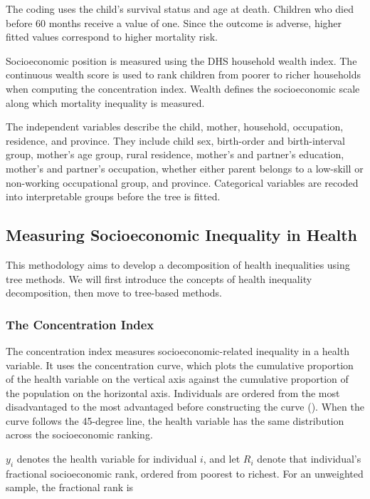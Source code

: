 \documentclass[
  11pt,
  a4paper,
]{article}
\begin{document}
The coding uses the child's survival status and age at death. Children
who died before 60 months receive a value of one. Since the outcome is
adverse, higher fitted values correspond to higher mortality risk.

Socioeconomic position is measured using the DHS household wealth index.
The continuous wealth score is used to rank children from poorer to
richer households when computing the concentration index. Wealth defines
the socioeconomic scale along which mortality inequality is measured.

The independent variables describe the child, mother, household,
occupation, residence, and province. They include child sex, birth-order
and birth-interval group, mother's age group, rural residence, mother's
and partner's education, mother's and partner's occupation, whether
either parent belongs to a low-skill or non-working occupational group,
and province. Categorical variables are recoded into interpretable
groups before the tree is fitted.

\subsection{Measuring Socioeconomic Inequality in
Health}\label{sec-measuring-socioeconomic-inequality}

This methodology aims to develop a decomposition of health inequalities
using tree methods. We will first introduce the concepts of health
inequality decomposition, then move to tree-based methods.

\subsubsection{The Concentration Index}\label{sec-concentration-index}

The concentration index measures socioeconomic-related inequality in a
health variable. It uses the concentration curve, which plots the
cumulative proportion of the health variable on the vertical axis
against the cumulative proportion of the population on the horizontal
axis. Individuals are ordered from the most disadvantaged to the most
advantaged before constructing the curve
(). When the curve follows the 45-degree line, the health
variable has the same distribution across the socioeconomic ranking.

\(y_i\) denotes the health variable for individual \(i\), and let
\(R_i\) denote that individual's fractional socioeconomic rank, ordered
from poorest to richest. For an unweighted sample, the fractional rank
is
\end{document}
